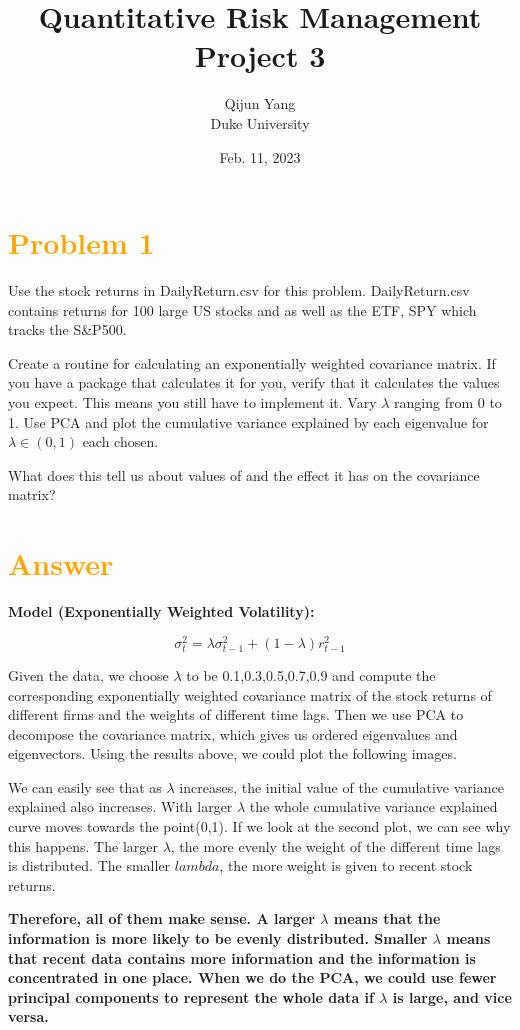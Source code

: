 \documentclass[11pt,en]{elegantpaper}
\title{Quantitative Risk Management Project 3}
\author{Qijun Yang \\ Duke University}
\institute{\href{https://fintech.meng.duke.edu}{Financial Technology at Duke University}}
\date{Feb. 11, 2023}
\begin{document}
\maketitle

\section*{\textcolor{orange}{Problem 1}}
Use the stock returns in DailyReturn.csv for this problem. 
DailyReturn.csv contains returns for 100 large US stocks and as well as the ETF, 
SPY which tracks the S\&P500.

Create a routine for calculating an exponentially weighted covariance matrix. If you have a
package that calculates it for you, verify that it calculates the values you expect. This means
you still have to implement it. Vary $\lambda$ ranging from 0 to 1. Use PCA and plot the cumulative 
variance explained by each eigenvalue for $\lambda \in (0,1)$ each chosen.

What does this tell us about values of and the effect it has on the covariance matrix?

\section*{\textcolor{orange}{Answer}}
\textbf{Model (Exponentially Weighted Volatility): }

\[\sigma_t^2=\lambda \sigma_{t-1}^2+(1-\lambda)r_{t-1}^2\]


Given the data, we choose $\lambda$ to be 0.1,0.3,0.5,0.7,0.9 and 
compute the corresponding exponentially weighted covariance matrix of 
the stock returns of different firms and the weights of different time lags. Then we use PCA to decompose the covariance matrix, which gives us ordered eigenvalues and eigenvectors. Using the results above, we could plot the following images. 

We can easily see that as $\lambda$ increases, the initial value of the
cumulative variance explained also increases. With larger $\lambda$ 
the whole cumulative variance explained curve moves towards the point(0,1).
If we look at the second plot, we can see why this happens. The larger 
$\lambda$, the more evenly the weight of the different time lags 
is distributed. The smaller $lambda$, the more weight is given to 
recent stock returns.

\textbf{Therefore, all of them make sense. A larger $\lambda$ means that 
the information is more likely to be evenly distributed. Smaller 
$\lambda$ means that recent data contains more information and the 
information is concentrated in one place. When we do the PCA, we could 
use fewer principal components to represent the whole data if $\lambda$ 
is large, and vice versa.}
\end{document}

